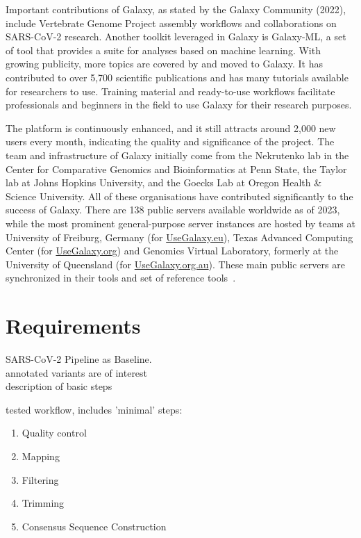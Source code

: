 Important contributions of Galaxy, as stated by the Galaxy Community (2022), include Vertebrate Genome Project assembly workflows and collaborations on SARS-CoV-2 research. Another toolkit leveraged in Galaxy is Galaxy-ML, a set of tool that provides a suite for analyses based on machine learning. With growing publicity, more topics are covered by and moved to Galaxy. It has contributed to over 5,700 scientific publications and has many tutorials available for researchers to use. Training material and ready-to-use workflows facilitate professionals and beginners in the field to use Galaxy for their research purposes.

The platform is continuously enhanced, and it still attracts around 2,000 new users every month, indicating the quality and significance of the project. The team and infrastructure of Galaxy initially come from the Nekrutenko lab in the Center for Comparative Genomics and Bioinformatics at Penn State, the Taylor lab at Johns Hopkins University, and the Goecks Lab at Oregon Health \& Science University. All of these organisations have contributed significantly to the success of Galaxy. There are 138 public servers available worldwide as of 2023, while the most prominent general-purpose server instances are hosted by teams at University of Freiburg, Germany (for \href{https://usegalaxy.eu/}{UseGalaxy.eu}), Texas Advanced Computing Center (for \href{https://usegalaxy.org/}{UseGalaxy.org}) and Genomics Virtual Laboratory, formerly at the University of Queensland (for \href{https://usegalaxy.org.au/}{UseGalaxy.org.au}). These main public servers are synchronized in their tools and set of reference tools~\cite{10.1093/nar/gkac247}.

\section{Requirements}

SARS-CoV-2 Pipeline as Baseline. \\
annotated variants are of interest \\
description of basic steps


tested workflow, includes 'minimal' steps:
\begin{enumerate}
	\item Quality control
	\item Mapping
	\item Filtering
	\item Trimming
	\item Consensus Sequence Construction
\end{enumerate}

